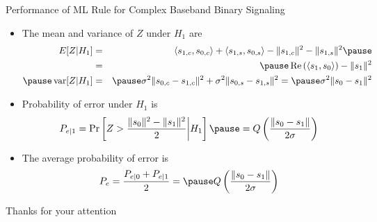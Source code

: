 \documentclass[t]{beamer}
\newcommand{\var}{\operatornamewithlimits{var}}
\renewcommand\Re{\operatorname{Re}}
\begin{document}
\begin{frame}{Performance of ML Rule for Complex Baseband Binary Signaling}
  \footnotesize
  \begin{itemize}
    \item The mean and variance of $Z$ under $H_1$ are
      \begin{eqnarray*}
        E[Z|H_1] & = & \langle s_{1,c},s_{0,c} \rangle + \langle s_{1,s},s_{0,s} \rangle  - \lVert s_{1,c} \rVert^2 - \lVert s_{1,s} \rVert^2 \pause \\
                 & = & \pause \Re\left(\langle s_1,s_0 \rangle\right) - \lVert s_1 \rVert^2\\ \pause
     \var[Z|H_1] & = & \pause \sigma^2\lVert s_{0,c} - s_{1,c}\rVert^2 + \sigma^2\lVert s_{0,s} - s_{1,s}\rVert^2 = \pause \sigma^2\lVert s_0 - s_1\rVert^2
      \end{eqnarray*}
    \item \pause Probability of error under $H_1$ is
      \begin{eqnarray*}
        P_{e|1} = \Pr\left[ Z >  \frac{\lVert s_0 \rVert^2 -\lVert s_1 \rVert^2}{2} \bigg| H_1\right] \pause = Q\left(\frac{\lVert s_0 - s_1 \rVert}{2\sigma} \right)
      \end{eqnarray*}
    \item \pause The average probability of error is
      \begin{eqnarray*}
        P_e = \frac{P_{e|0}+P_{e|1}}{2} = \pause Q\left(\frac{\lVert s_0 - s_1 \rVert}{2\sigma} \right)
      \end{eqnarray*}
  \end{itemize}
  \normalsize
\end{frame}

\begin{frame}{}
\vfill
\begin{center}
Thanks for your attention
\end{center}
\vfill
\end{frame}
\end{document}
